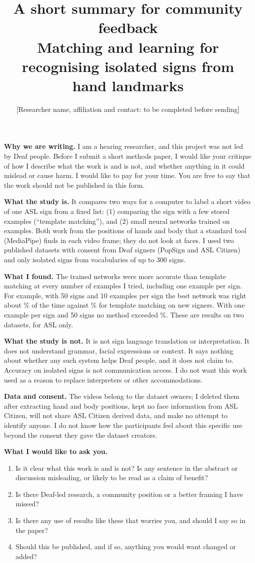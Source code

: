 \documentclass[11pt]{article}
\title{A short summary for community feedback\\ \large Matching and learning for recognising isolated signs from hand landmarks}
\author{[Researcher name, affiliation and contact: to be completed before sending]}
\date{}
\begin{document}
\maketitle
\textbf{Why we are writing.} I am a hearing researcher, and this project was not led by Deaf people. Before I submit a short methods
paper, I would like your critique of how I describe what the work is and is not, and whether anything in it could mislead or cause harm.
I would like to pay for your time. You are free to say that the work should not be published in this form.

\textbf{What the study is.} It compares two ways for a computer to label a short video of one ASL sign from a fixed list: (1) comparing the
sign with a few stored examples (``template matching''), and (2) small neural networks trained on examples. Both work from the positions of
hands and body that a standard tool (MediaPipe) finds in each video frame; they do not look at faces. I used two published datasets with
consent from Deaf signers (PopSign and ASL Citizen) and only isolated signs from vocabularies of up to 300 signs.

\textbf{What I found.} The trained networks were more accurate than template matching at every number of examples I tried, including one
example per sign. For example, with 50 signs and 10 examples per sign the best network was right about \accCnnVFiftyKTen\% of the time against
\accDtwVFiftyKTen\% for template matching on new signers. With one example per sign and 50 signs no method exceeded \accTransVFiftyKOne\%.
These are results on two datasets, for ASL only.

\textbf{What the study is not.} It is not sign language translation or interpretation. It does not understand grammar, facial expressions or
context. It says nothing about whether any such system helps Deaf people, and it does not claim to. Accuracy on isolated signs is not
communication access. I do not want this work used as a reason to replace interpreters or other accommodations.

\textbf{Data and consent.} The videos belong to the dataset owners; I deleted them after extracting hand and body positions, kept no face
information from ASL Citizen, will not share ASL Citizen derived data, and make no attempt to identify anyone. I do not know how the
participants feel about this specific use beyond the consent they gave the dataset creators.

\textbf{What I would like to ask you.}
\begin{enumerate}[leftmargin=*,itemsep=2pt]
\item Is it clear what this work is and is not? Is any sentence in the abstract or discussion misleading, or likely to be read as a claim of benefit?
\item Is there Deaf-led research, a community position or a better framing I have missed?
\item Is there any use of results like these that worries you, and should I say so in the paper?
\item Should this be published, and if so, anything you would want changed or added?
\end{enumerate}
\end{document}
